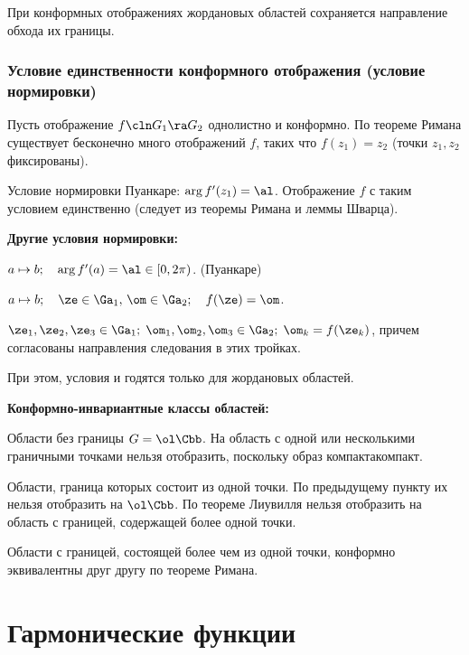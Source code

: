 \documentclass[a4paper]{article}
\begin{document}
\begin{theorem}
\begin{imp}
При конформных отображениях жордановых областей сохраняется направление обхода их границы.
\end{imp}

\subsubsection{Условие единственности конформного отображения (условие нормировки)}

Пусть отображение $f\cln G_1\ra G_2$ однолистно и конформно. По теореме
Римана существует бесконечно много отображений $f$,  таких что
$f(z_1)=z_2$ (точки $z_1, z_2$ фиксированы).

Условие нормировки Пуанкаре: $\arg f'(z_1)=\al$.
Отображение $f$ с таким условием единственно (следует из теоремы Римана и леммы Шварца).

\textbf{Другие условия нормировки:}

\begin{points}{-1}
\item $a\mapsto b; \quad \arg f'(a)=\al\in[0,2\pi)$. (Пуанкаре)
\item $a\mapsto b; \quad \ze\in\Ga_1, \, \om\in\Ga_2; \quad f(\ze)=\om$.
\item $\ze_1, \ze_2, \ze_3\in\Ga_1;\; \om_1, \om_2, \om_3\in\Ga_2;\;\om_k=f(\ze_k)$,
причем согласованы направления следования в этих тройках.
\end{points}

При этом, условия  и  годятся только для жордановых областей.

\textbf{Конформно-инвариантные классы областей:}

\begin{points}{-1}
\item Области без границы $G=\ol\Cbb$. На область с одной или несколькими граничными точками нельзя отобразить,
поскольку образ компакта\т компакт.
\item Области, граница которых состоит из одной точки.
По предыдущему пункту их нельзя отобразить на $\ol\Cbb$. По теореме Лиувилля нельзя
отобразить на область с границей, содержащей более одной точки.
\item Области с границей, состоящей более чем из одной точки, конформно эквивалентны друг другу по теореме Римана.
\end{points}

\section{Гармонические функции}


\end{theorem}
\end{document}
